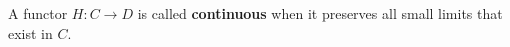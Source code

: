A functor $H: C \rightarrow D$ is called \textbf{continuous} when it preserves all small limits that exist in $C$.